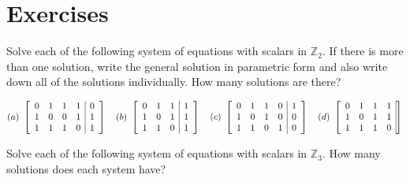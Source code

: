 \section*{Exercises}

\begin{enumialphparenastyle}

\begin{ex}
  Solve each of the following system of equations with scalars in
  $\mathbb{Z}_2$. If there is more than one solution, write the
  general solution in parametric form and also write down all of the
  solutions individually. How many solutions are there?

  \begin{equation*}
    (a)~
    \left[
    \begin{array}{rrrr|r}
      0 & 1 & 1 & 1 & 0 \\
      1 & 0 & 0 & 1 & 1 \\
      1 & 1 & 1 & 0 & 1
    \end{array}
    \right]
    \quad
    (b)~
    \left[
    \begin{array}{rrr|r}
      0 & 1 & 1 & 1 \\
      1 & 0 & 1 & 1 \\
      1 & 1 & 0 & 1
    \end{array}
    \right]
    \quad
    (c)~
    \left[
    \begin{array}{rrrr|r}
      0 & 1 & 1 & 0 & 1 \\
      1 & 0 & 1 & 0 & 0 \\
      1 & 1 & 0 & 1 & 0
    \end{array}
    \right]
    \quad
    (d)~
    \left[
    \begin{array}{rrrr|r}
      0 & 1 & 1 & 1 \\
      1 & 0 & 1 & 1 \\
      1 & 1 & 1 & 0
    \end{array}
    \right]
  \end{equation*}
\end{ex}

\begin{ex}
  Solve each of the following system of equations with scalars in
  $\mathbb{Z}_3$. How many solutions does each system have?


\end{ex}
\end{enumialphparenastyle}
